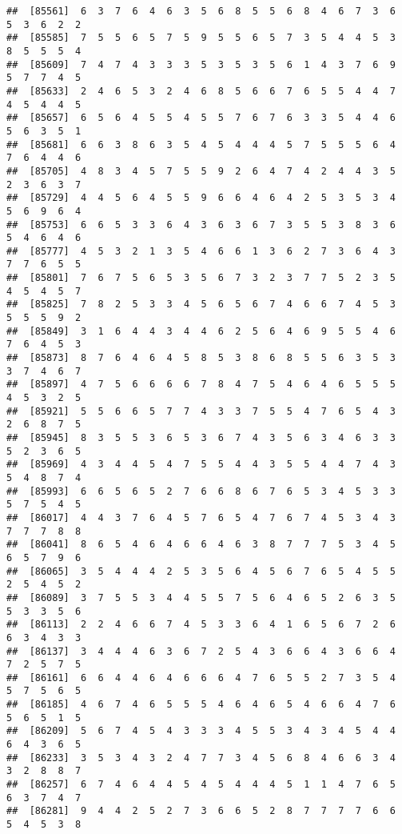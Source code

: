 \documentclass[
]{book}
\begin{document}
\begin{verbatim}
##  [85561]  6  3  7  6  4  6  3  5  6  8  5  5  6  8  4  6  7  3  6  5  3  6  2  2
##  [85585]  7  5  5  6  5  7  5  9  5  5  6  5  7  3  5  4  4  5  3  8  5  5  5  4
##  [85609]  7  4  7  4  3  3  3  5  3  5  3  5  6  1  4  3  7  6  9  5  7  7  4  5
##  [85633]  2  4  6  5  3  2  4  6  8  5  6  6  7  6  5  5  4  4  7  4  5  4  4  5
##  [85657]  6  5  6  4  5  5  4  5  5  7  6  7  6  3  3  5  4  4  6  5  6  3  5  1
##  [85681]  6  6  3  8  6  3  5  4  5  4  4  4  5  7  5  5  5  6  4  7  6  4  4  6
##  [85705]  4  8  3  4  5  7  5  5  9  2  6  4  7  4  2  4  4  3  5  2  3  6  3  7
##  [85729]  4  4  5  6  4  5  5  9  6  6  4  6  4  2  5  3  5  3  4  5  6  9  6  4
##  [85753]  6  6  5  3  3  6  4  3  6  3  6  7  3  5  5  3  8  3  6  5  4  6  4  6
##  [85777]  4  5  3  2  1  3  5  4  6  6  1  3  6  2  7  3  6  4  3  7  7  6  5  5
##  [85801]  7  6  7  5  6  5  3  5  6  7  3  2  3  7  7  5  2  3  5  4  5  4  5  7
##  [85825]  7  8  2  5  3  3  4  5  6  5  6  7  4  6  6  7  4  5  3  5  5  5  9  2
##  [85849]  3  1  6  4  4  3  4  4  6  2  5  6  4  6  9  5  5  4  6  7  6  4  5  3
##  [85873]  8  7  6  4  6  4  5  8  5  3  8  6  8  5  5  6  3  5  3  3  7  4  6  7
##  [85897]  4  7  5  6  6  6  6  7  8  4  7  5  4  6  4  6  5  5  5  4  5  3  2  5
##  [85921]  5  5  6  6  5  7  7  4  3  3  7  5  5  4  7  6  5  4  3  2  6  8  7  5
##  [85945]  8  3  5  5  3  6  5  3  6  7  4  3  5  6  3  4  6  3  3  5  2  3  6  5
##  [85969]  4  3  4  4  5  4  7  5  5  4  4  3  5  5  4  4  7  4  3  5  4  8  7  4
##  [85993]  6  6  5  6  5  2  7  6  6  8  6  7  6  5  3  4  5  3  3  5  7  5  4  5
##  [86017]  4  4  3  7  6  4  5  7  6  5  4  7  6  7  4  5  3  4  3  7  7  7  8  8
##  [86041]  8  6  5  4  6  4  6  6  4  6  3  8  7  7  7  5  3  4  5  6  5  7  9  6
##  [86065]  3  5  4  4  4  2  5  3  5  6  4  5  6  7  6  5  4  5  5  2  5  4  5  2
##  [86089]  3  7  5  5  3  4  4  5  5  7  5  6  4  6  5  2  6  3  5  5  3  3  5  6
##  [86113]  2  2  4  6  6  7  4  5  3  3  6  4  1  6  5  6  7  2  6  6  3  4  3  3
##  [86137]  3  4  4  4  6  3  6  7  2  5  4  3  6  6  4  3  6  6  4  7  2  5  7  5
##  [86161]  6  6  4  4  6  4  6  6  6  4  7  6  5  5  2  7  3  5  4  5  7  5  6  5
##  [86185]  4  6  7  4  6  5  5  5  4  6  4  6  5  4  6  6  4  7  6  5  6  5  1  5
##  [86209]  5  6  7  4  5  4  3  3  3  4  5  5  3  4  3  4  5  4  4  6  4  3  6  5
##  [86233]  3  5  3  4  3  2  4  7  7  3  4  5  6  8  4  6  6  3  4  3  2  8  8  7
##  [86257]  6  7  4  6  4  4  5  4  5  4  4  4  5  1  1  4  7  6  5  6  3  7  4  7
##  [86281]  9  4  4  2  5  2  7  3  6  6  5  2  8  7  7  7  7  6  6  5  4  5  3  8

\end{verbatim}
\end{document}
